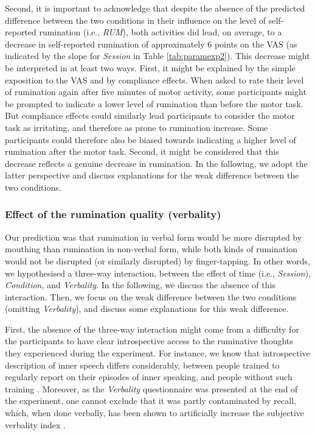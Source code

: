 \documentclass[12pt,]{book}
\theoremstyle{definition}
\theoremstyle{definition}
\theoremstyle{definition}
\theoremstyle{remark}
\begin{document}
Second, it is important to acknowledge that despite the absence of the
predicted difference between the two conditions in their influence on
the level of self-reported rumination (i.e., \emph{RUM}), both
activities did lead, on average, to a decrease in self-reported
rumination of approximately 6 points on the VAS (as indicated by the
slope for \emph{Session} in Table \ref{tab:paramexp2}). This decrease
might be interpreted in at least two ways. First, it might be explained
by the simple exposition to the VAS and by compliance effects. When
asked to rate their level of rumination again after five minutes of
motor activity, some participants might be prompted to indicate a lower
level of rumination than before the motor task. But compliance effects
could similarly lead participants to consider the motor task as
irritating, and therefore as prone to rumination increase. Some
participants could therefore also be biased towards indicating a higher
level of rumination after the motor task. Second, it might be considered
that this decrease reflects a genuine decrease in rumination. In the
following, we adopt the latter perspective and discuss explanations for
the weak difference between the two conditions.

\subsubsection{Effect of the rumination quality
(verbality)}\label{effect-of-the-rumination-quality-verbality}

Our prediction was that rumination in verbal form would be more
disrupted by mouthing than rumination in non-verbal form, while both
kinds of rumination would not be disrupted (or similarly disrupted) by
finger-tapping. In other words, we hypothesised a three-way interaction,
between the effect of time (i.e., \emph{Session}), \emph{Condition}, and
\emph{Verbality}. In the following, we discuss the absence of this
interaction. Then, we focus on the weak difference between the two
conditions (omitting \emph{Verbality}), and discuss some explanations
for this weak difference.

First, the absence of the three-way interaction might come from a
difficulty for the participants to have clear introspective access to
the ruminative thoughts they experienced during the experiment. For
instance, we know that introspective description of inner speech differs
considerably, between people trained to regularly report on their
episodes of inner speaking, and people without such training
\citep[e.g.,][]{Hurlburt2013}. Moreover, as the \emph{Verbality}
questionnaire was presented at the end of the experiment, one cannot
exclude that it was partly contaminated by recall, which, when done
verbally, has been shown to artificially increase the subjective
verbality index \citep{Hurlburt2011}.
\end{document}
